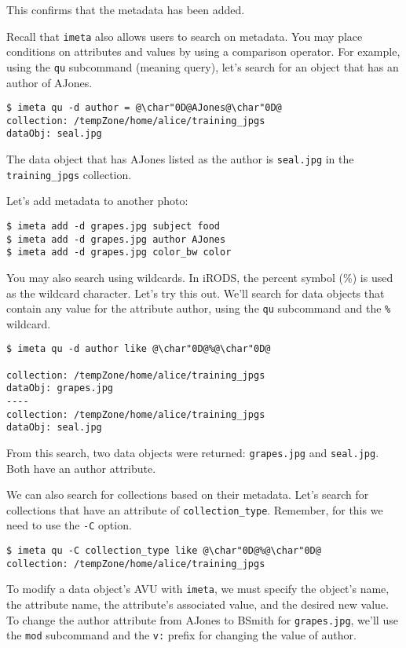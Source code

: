 \documentclass[10pt,oneside]{memoir}
\begin{document}
This confirms that the metadata has been added.

Recall that \texttt{imeta} also allows users to search on metadata. You may place conditions on attributes and values by using a comparison operator. For example, using the \texttt{qu} subcommand (meaning query), let's search for an object that has an author of AJones.

\begin{lstlisting}
$ imeta qu -d author = @\char"0D@AJones@\char"0D@
collection: /tempZone/home/alice/training_jpgs
dataObj: seal.jpg
\end{lstlisting}

The data object that has AJones listed as the author is \texttt{seal.jpg} in the \texttt{training\_jpgs} collection.

Let's add metadata to another photo:

\begin{lstlisting}
$ imeta add -d grapes.jpg subject food
$ imeta add -d grapes.jpg author AJones
$ imeta add -d grapes.jpg color_bw color
\end{lstlisting}

You may also search using wildcards. In iRODS, the percent symbol (\%) is used as the wildcard character. Let's try this out. We'll search for data objects that contain any value for the attribute author, using the \texttt{qu} subcommand and the \texttt{\%} wildcard.

\begin{lstlisting}
$ imeta qu -d author like @\char"0D@%@\char"0D@

collection: /tempZone/home/alice/training_jpgs
dataObj: grapes.jpg
----
collection: /tempZone/home/alice/training_jpgs
dataObj: seal.jpg
\end{lstlisting}

From this search, two data objects were returned: \texttt{grapes.jpg} and \texttt{seal.jpg}. Both have an author attribute.

We can also search for collections based on their metadata. Let's search for collections that have an attribute of \texttt{collection\_type}. Remember, for this we need to use the \texttt{-C} option.

\begin{lstlisting}
$ imeta qu -C collection_type like @\char"0D@%@\char"0D@
collection: /tempZone/home/alice/training_jpgs
\end{lstlisting}

To modify a data object's AVU with \texttt{imeta}, we must specify the object's name, the attribute name, the attribute's associated value, and the desired new value. To change the author attribute from AJones to BSmith for \texttt{grapes.jpg}, we'll use the \texttt{mod} subcommand and the \texttt{v:} prefix for changing the value of author.
\end{document}
